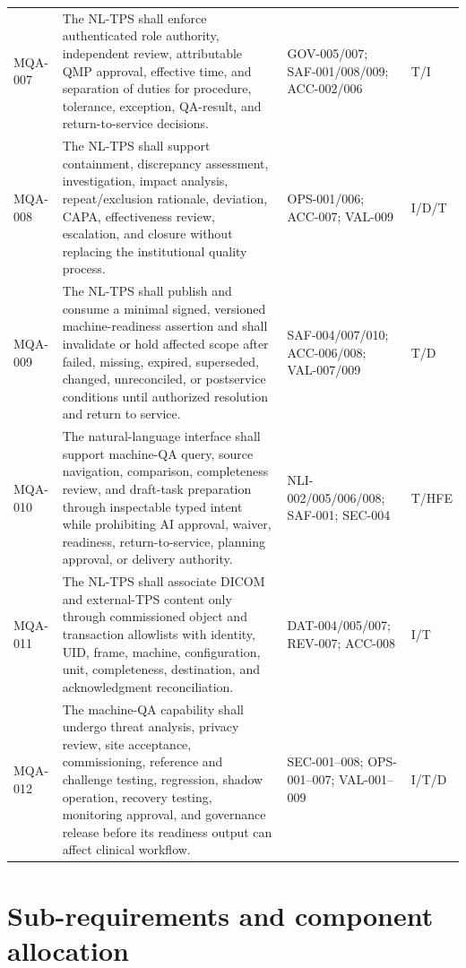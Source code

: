 \documentclass[11pt,letterpaper]{article}
\begin{document}
\begin{scriptsize}
\begin{longtable}{@{}L{0.11\textwidth}L{0.48\textwidth}L{0.23\textwidth}L{0.12\textwidth}@{}}
\addlinespace[2pt]
MQA-007 & The NL-TPS shall enforce authenticated role authority, independent review, attributable QMP approval, effective time, and separation of duties for procedure, tolerance, exception, QA-result, and return-to-service decisions. & GOV-005/007; SAF-001/008/009; ACC-002/006 & T/I \\
\addlinespace[2pt]
MQA-008 & The NL-TPS shall support containment, discrepancy assessment, investigation, impact analysis, repeat/exclusion rationale, deviation, CAPA, effectiveness review, escalation, and closure without replacing the institutional quality process. & OPS-001/006; ACC-007; VAL-009 & I/D/T \\
\addlinespace[2pt]
MQA-009 & The NL-TPS shall publish and consume a minimal signed, versioned machine-readiness assertion and shall invalidate or hold affected scope after failed, missing, expired, superseded, changed, unreconciled, or postservice conditions until authorized resolution and return to service. & SAF-004/007/010; ACC-006/008; VAL-007/009 & T/D \\
\addlinespace[2pt]
MQA-010 & The natural-language interface shall support machine-QA query, source navigation, comparison, completeness review, and draft-task preparation through inspectable typed intent while prohibiting AI approval, waiver, readiness, return-to-service, planning approval, or delivery authority. & NLI-002/005/006/008; SAF-001; SEC-004 & T/HFE \\
\addlinespace[2pt]
MQA-011 & The NL-TPS shall associate DICOM and external-TPS content only through commissioned object and transaction allowlists with identity, UID, frame, machine, configuration, unit, completeness, destination, and acknowledgment reconciliation. & DAT-004/005/007; REV-007; ACC-008 & I/T \\
\addlinespace[2pt]
MQA-012 & The machine-QA capability shall undergo threat analysis, privacy review, site acceptance, commissioning, reference and challenge testing, regression, shadow operation, recovery testing, monitoring approval, and governance release before its readiness output can affect clinical workflow. & SEC-001--008; OPS-001--007; VAL-001--009 & I/T/D \\
\end{longtable}
\end{scriptsize}

\section{Sub-requirements and component allocation}
\end{document}
